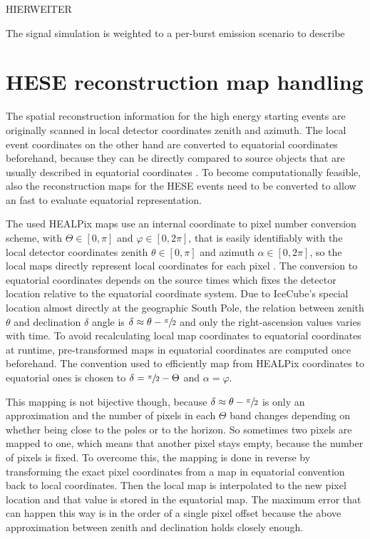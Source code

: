 HIERWEITER

The signal simulation is weighted to a per-burst emission scenario to describe


\section{HESE reconstruction map handling}
The spatial reconstruction information for the high energy starting events are originally scanned in local detector coordinates zenith and azimuth.
The local event coordinates on the other hand are converted to equatorial coordinates beforehand, because they can be directly compared to source objects that are  usually described in equatorial coordinates .
To become computationally feasible, also the reconstruction maps for the HESE events need to be converted to allow an fast to evaluate equatorial representation.

The used HEALPix maps use an internal coordinate to pixel number conversion scheme, with $\Theta\in[0, \pi]$ and $\varphi\in[0, 2\pi]$, that is easily identifiably with the local detector coordinates zenith $\theta\in[0, \pi]$ and azimuth $\alpha\in[0, 2\pi]$, so the local maps directly represent local coordinates for each pixel .
The conversion to equatorial coordinates depends on the source times which fixes the detector location relative to the equatorial coordinate system.
Due to IceCube's special location almost directly at the geographic South Pole, the relation between zenith $\theta$ and declination $\delta$ angle is $\delta \approx \theta - \sfrac{\pi}{2}$ and only the right-ascension values varies with time.
To avoid recalculating local map coordinates to equatorial coordinates at runtime, pre-transformed maps in equatorial coordinates are computed once beforehand.
The convention used to efficiently map from HEALPix coordinates to equatorial ones is chosen to $\delta = \sfrac{\pi}{2} - \Theta$ and $\alpha = \varphi$.

This mapping is not bijective though, because $\delta \approx \theta - \sfrac{\pi}{2}$ is only an approximation and the number of pixels in each $\Theta$ band changes depending on whether being close to the poles or to the horizon.
So sometimes two pixels are mapped to one, which means that another pixel stays empty, because the number of pixels is fixed.
To overcome this, the mapping is done in reverse by transforming the exact pixel coordinates from a map in equatorial convention back to local coordinates.
Then the local map is interpolated to the new pixel location and that value is stored in the equatorial map.
The maximum error that can happen this way is in the order of a single pixel offset because the above approximation between zenith and declination holds closely enough.

